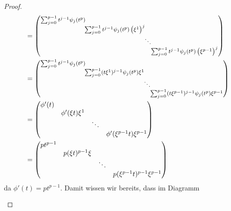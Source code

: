 \begin{proof}
\begin{align*}
  &=
{
  \footnotesize
  \begin{pmatrix}\sum_{j=0}^{p-1}t^{j-1}\psi_{j}(t^p)\!\!\!\!\\
    & \!\!\!\!\sum_{j=0}^{p-1}t^{j-1}\psi_{j}(t^p)\left(\xi^{1}\right)^{j}\!\!\!\!\\
    & & \!\!\!\!\ddots\!\!\!\!\\
    &  &  & \!\!\!\!\sum_{j=0}^{p-1}t^{j-1}\psi_{j}(t^p)\left(\xi^{p-1}\right)^{j}
  \end{pmatrix}
}\\
  &=
{
  \footnotesize
  \begin{pmatrix}\sum_{j=0}^{p-1}t^{j-1}\psi_{j}(t^p)\!\!\!\!\\
    & \!\!\!\!\sum_{j=0}^{p-1}(t\xi^1)^{j-1}\psi_{j}(t^p)\xi^{1}\!\!\!\!\\
    & & \!\!\!\!\ddots\!\!\!\!\\
    &  &  & \!\!\!\!\sum_{j=0}^{p-1}(t\xi^{p-1})^{j-1}\psi_{j}(t^p)\xi^{p-1}
  \end{pmatrix}
}\\
  &= \begin{pmatrix}\phi'(t)\\
    & \phi'(\xi t)\xi^{1}\\
    & & \ddots\\
    &  &  & \phi'(\xi^{p-1} t)\xi^{p-1}
  \end{pmatrix}\\
  &= \begin{pmatrix} pt^{p-1}\\
    & p(\xi t)^{p-1}\xi\\
    & & \ddots\\
    &  &  & p(\xi^{p-1} t)^{p-1}\xi^{p-1}
  \end{pmatrix}\\
\end{align*}
da $\phi'(t)=pt^{p-1}$.
Damit wissen wir bereits, dass im Diagramm
\begin{center}
\end{center}
\end{proof}
